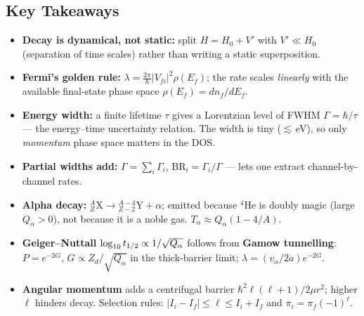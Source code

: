 
\subsection*{Key Takeaways}
\begin{itemize}
  \item \textbf{Decay is dynamical, not static:} split $H = H_0 + V'$ with
  $V'\ll H_0$ (separation of time scales) rather than writing a static
  superposition.
  \item \textbf{Fermi's golden rule:} $\lambda = \frac{2\pi}{\hbar}|V_{fi}|^2\rho(E_f)$;
  the rate scales \emph{linearly} with the available final-state phase space
  $\rho(E_f) = dn_f/dE_f$.
  \item \textbf{Energy width:} a finite lifetime $\tau$ gives a Lorentzian level
  of FWHM $\Gamma = \hbar/\tau$ --- the energy--time uncertainty relation.  The
  width is tiny ($\lesssim$\,eV), so only \emph{momentum} phase space matters in
  the DOS.
  \item \textbf{Partial widths add:} $\Gamma = \sum_i\Gamma_i$,
  $\mathrm{BR}_i = \Gamma_i/\Gamma$ --- lets one extract channel-by-channel rates.
  \item \textbf{Alpha decay:} ${}^{A}_{Z}\mathrm{X}\to{}^{A-4}_{Z-2}\mathrm{Y}+\alpha$;
  emitted because $^4$He is doubly magic (large $Q_\alpha>0$), not because it is a
  noble gas.  $T_\alpha \approx Q_\alpha(1-4/A)$.
  \item \textbf{Geiger--Nuttall} $\log_{10}t_{1/2} \propto 1/\sqrt{Q_\alpha}$
  follows from \textbf{Gamow tunnelling}: $P=e^{-2G}$,
  $G\propto Z_d/\sqrt{Q_\alpha}$ in the thick-barrier limit;
  $\lambda = (v_\alpha/2a)e^{-2G}$.
  \item \textbf{Angular momentum} adds a centrifugal barrier
  $\hbar^2\ell(\ell+1)/2\mu r^2$; higher $\ell$ hinders decay.  Selection rules:
  $|I_i-I_f|\le\ell\le I_i+I_f$ and $\pi_i = \pi_f(-1)^\ell$.
\end{itemize}
